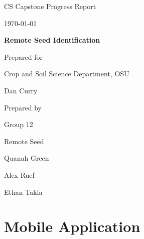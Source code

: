 \documentclass[onecolumn, draftclsnofoot,10pt, compsoc]{IEEEtran}
\def \CapstoneTeamName{		Remote Seed}
\def \CapstoneTeamNumber{		12}
\def \GroupMemberOne{			Quanah Green}
\def \GroupMemberTwo{			Alex Ruef}
\def \GroupMemberThree{			Ethan Takla}
\def \CapstoneProjectName{		Remote Seed Identification}
\def \CapstoneSponsorCompany{	Crop and Soil Science Department, OSU}
\def \CapstoneSponsorPerson{		Dan Curry}
\def \DocType{		%
				Progress Report
				}
\newcommand{\NameSigPair}[1]{\par
\makebox[2.75in][r]{#1} \hfil 	\makebox[3.25in]{\makebox[2.25in]{\hrulefill} \hfill		\makebox[.75in]{\hrulefill}}
\par\vspace{-12pt} \textit{\tiny\noindent
\makebox[2.75in]{} \hfil		\makebox[3.25in]{\makebox[2.25in][r]{Signature} \hfill	\makebox[.75in][r]{Date}}}}
\renewcommand{\NameSigPair}[1]{#1}
\begin{document}
\begin{titlepage}
    \begin{singlespace}
        \hfill 
        \par\vspace{.2in}
        \centering
        \scshape{
            \huge CS Capstone \DocType \par
            {\large\today}\par
            \vspace{.5in}
            \textbf{\Huge\CapstoneProjectName}\par
            \vfill
            {\large Prepared for}\par
            \Huge \CapstoneSponsorCompany\par
            \vspace{5pt}
            {\Large\NameSigPair{\CapstoneSponsorPerson}\par}
            {\large Prepared by }\par
            Group\CapstoneTeamNumber\par
            \CapstoneTeamName\par 
            \vspace{5pt}
            {\Large
                \NameSigPair{\GroupMemberOne}\par
                \NameSigPair{\GroupMemberTwo}\par
                \NameSigPair{\GroupMemberThree}\par
            }
            \vspace{20pt}
        }
        \begin{abstract}
        		

        \end{abstract}     
    \end{singlespace}
\end{titlepage}
\newpage
{}
\tableofcontents
\clearpage
\section{Mobile Application}
\end{document}
